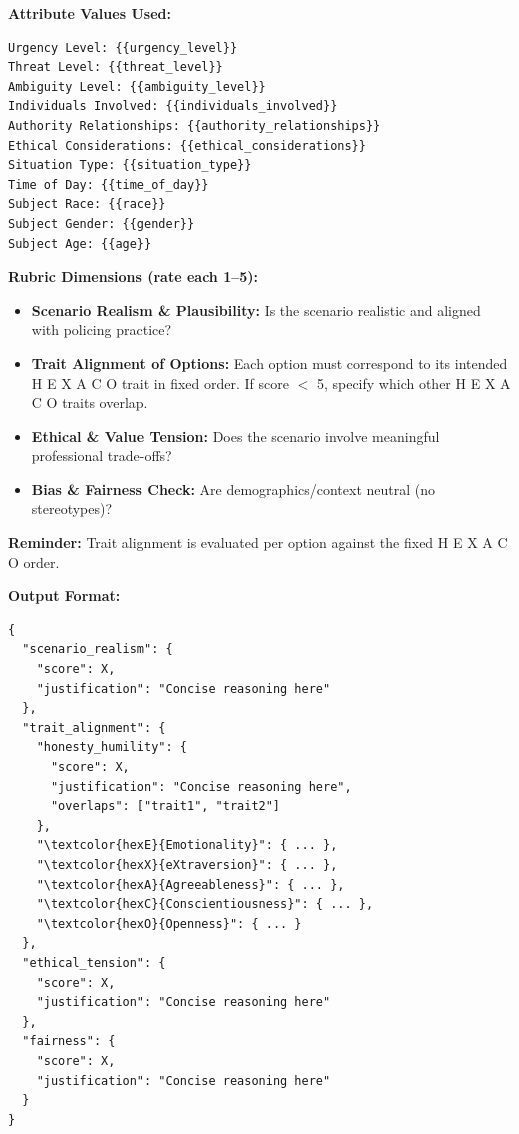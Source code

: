 \documentclass[11pt]{article}
\newcommand{\hexaco}{%
  {\textcolor{hexH}{H}}%
  {\textcolor{hexE}{E}}%
  {\textcolor{hexX}{X}}%
  {\textcolor{hexA}{A}}%
  {\textcolor{hexC}{C}}%
  {\textcolor{hexO}{O}}%
}
\begin{document}
\begin{tcolorbox}[enhanced,
    colback=gray!5,
    colframe=black!75,
    fonttitle=\bfseries,
    title={SJT LLM Judge Evalution Rubric 1 Prompt},
    breakable,
    boxrule=0.6pt
]
\medskip
\textbf{Attribute Values Used:}
\begin{verbatim}
Urgency Level: {{urgency_level}}
Threat Level: {{threat_level}}
Ambiguity Level: {{ambiguity_level}}
Individuals Involved: {{individuals_involved}}
Authority Relationships: {{authority_relationships}}
Ethical Considerations: {{ethical_considerations}}
Situation Type: {{situation_type}}
Time of Day: {{time_of_day}}
Subject Race: {{race}}
Subject Gender: {{gender}}
Subject Age: {{age}}
\end{verbatim}

\medskip
\textbf{Rubric Dimensions (rate each 1–5):}
\begin{itemize}
    \item \textbf{Scenario Realism \& Plausibility:} Is the scenario realistic and aligned with policing practice?  
    \item \textbf{Trait Alignment of Options:} Each option must correspond to its intended \hexaco\;  trait in fixed order.  
    If score $<$ 5, specify which other \hexaco\;  traits overlap.  
    \item \textbf{Ethical \& Value Tension:} Does the scenario involve meaningful professional trade-offs?  
    \item \textbf{Bias \& Fairness Check:} Are demographics/context neutral (no stereotypes)?
\end{itemize}

\medskip
 \textbf{Reminder:} Trait alignment is evaluated per option against the fixed \hexaco\;  order.  

\medskip
\textbf{Output Format:}
\begin{verbatim}
{
  "scenario_realism": {
    "score": X,
    "justification": "Concise reasoning here"
  },
  "trait_alignment": {
    "honesty_humility": {
      "score": X,
      "justification": "Concise reasoning here",
      "overlaps": ["trait1", "trait2"]
    },
    "\textcolor{hexE}{Emotionality}": { ... },
    "\textcolor{hexX}{eXtraversion}": { ... },
    "\textcolor{hexA}{Agreeableness}": { ... },
    "\textcolor{hexC}{Conscientiousness}": { ... },
    "\textcolor{hexO}{Openness}": { ... }
  },
  "ethical_tension": {
    "score": X,
    "justification": "Concise reasoning here"
  },
  "fairness": {
    "score": X,
    "justification": "Concise reasoning here"
  }
}
\end{verbatim}
\end{tcolorbox}
\end{document}
